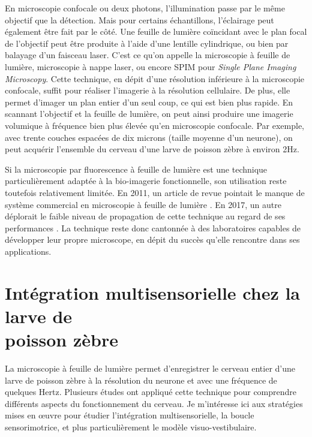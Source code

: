 En microscopie confocale ou deux photons, l'illumination passe par le même objectif que la détection. Mais pour certains échantillons, l'éclairage peut également être fait par le côté. Une feuille de lumière coïncidant avec le plan focal de l'objectif peut être produite à l'aide d'une lentille cylindrique, ou bien par balayage d'un faisceau laser. C'est ce qu'on appelle la microscopie à feuille de lumière, microscopie à nappe laser, ou encore SPIM pour \emph{Single Plane Imaging Microscopy}. Cette technique, en dépit d'une résolution inférieure à la microscopie confocale, suffit pour réaliser l'imagerie à la résolution cellulaire. De plus, elle permet d'imager un plan entier d'un seul coup, ce qui est bien plus rapide. En scannant l'objectif et la feuille de lumière, on peut ainsi produire une imagerie volumique à fréquence bien plus élevée qu'en microscopie confocale. Par exemple, avec trente couches espacées de dix microns (taille moyenne d'un neurone), on peut acquérir l'ensemble du cerveau d'une larve de poisson zèbre à environ 2Hz.

Si la microscopie par fluorescence à feuille de lumière est une technique particulièrement adaptée à la bio-imagerie fonctionnelle, son utilisation reste toutefois relativement limitée. En 2011, un article de revue pointait le manque de système commercial en microscopie à feuille de lumière \cite{santi_light_2011}. En 2017, un autre déplorait le faible niveau de propagation de cette technique au regard de ses performances \cite{power_guide_2017}. La technique reste donc cantonnée à des laboratoires capables de développer leur propre microscope, en dépit du succès qu'elle rencontre dans ses applications.


\section[Chez la larve de poisson zèbre]{Intégration multisensorielle chez la larve de \\ poisson zèbre}

La microscopie à feuille de lumière permet d'enregistrer le cerveau entier d'une larve de poisson zèbre à la résolution du neurone et avec une fréquence de quelques Hertz. Plusieurs études ont appliqué cette technique pour comprendre différents aspects du fonctionnement du cerveau. Je m'intéresse ici aux stratégies mises en œuvre pour étudier l'intégration multisensorielle, la boucle sensorimotrice, et plus particulièrement le modèle visuo-vestibulaire.


